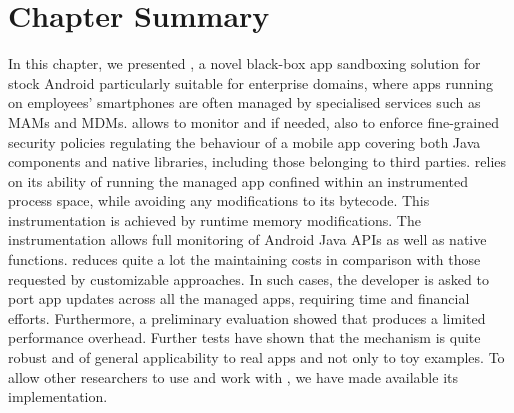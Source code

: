 \section{Chapter Summary}

In this chapter, we presented \asd, a novel black-box app sandboxing solution for stock Android particularly suitable for enterprise domains, where apps running on employees' smartphones are often managed by specialised services such as MAMs and MDMs.  
\asd allows to monitor and if needed, also to enforce fine-grained security policies regulating the behaviour of a mobile app covering both Java components and native libraries, including those belonging to third parties.  \asd relies on its ability of running the managed app confined within an instrumented process space, while avoiding any modifications to its bytecode. This instrumentation is achieved  by runtime memory modifications. The instrumentation  allows full monitoring of Android Java APIs as well as native functions.  \asd reduces quite a lot the maintaining costs in comparison with those requested by customizable approaches. In such cases, the developer is asked to port app updates across all the managed apps, requiring time and financial efforts. Furthermore, a preliminary evaluation showed that \asd produces a limited performance overhead. Further tests have shown that the mechanism is quite robust and of general applicability to real apps and not only to toy examples. To allow other researchers to use and work with \asd, we have made available its implementation.